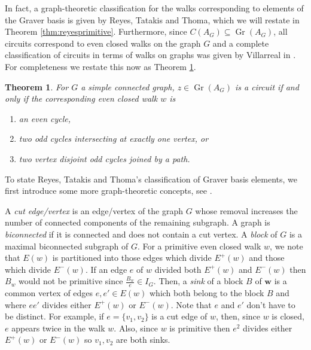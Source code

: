 \documentclass[a4paper, 12pt]{article}
\theoremstyle{plain}
\newtheorem{theorem}{Theorem}[section]
\theoremstyle{definition}
\theoremstyle{remark}
\begin{document}
In fact, a graph-theoretic classification for the walks corresponding to elements of the Graver basis is given by Reyes, Tatakis and Thoma, which we will restate in Theorem \ref{thm:reyesprimitive}. Furthermore, since $C(A_G) \subseteq \operatorname{Gr}(A_G)$, all circuits correspond to even closed walks on the graph $G$ and a complete classification of circuits in terms of walks on graphs was given by Villarreal in \cite[Proposition 4.2]{Vil_1995}. For completeness we restate this now as Theorem \ref{thm:villarealcircuits}.

\begin{theorem} \cite[Proposition 4.2]{Vil_1995} \label{thm:villarealcircuits}
    For $G$ a simple connected graph, $z \in \operatorname{Gr}(A_G)$ is a circuit if and only if the corresponding even closed walk $w$ is
    \begin{enumerate}
        \item\label{item:circ1} an even cycle,
        \item\label{item:circ2} two odd cycles intersecting at exactly one vertex, or
        \item\label{item:circ3} two vertex disjoint odd cycles joined by a path.
    \end{enumerate}
\end{theorem}

To state Reyes, Tatakis and Thoma's classification of Graver basis elements, we first introduce some more graph-theoretic concepts, see \cite[Section 3]{Reyes2012minimal}.

A \textit{cut edge/vertex} is an edge/vertex of the graph $G$ whose removal increases the number of connected components of the remaining subgraph. A graph is \textit{biconnected} if it is connected and does not contain a cut vertex. A \textit{block} of $G$ is a maximal biconnected subgraph of $G$. For a primitive even closed walk $w$, we note that $E(w)$ is partitioned into those edges which divide $E^+(w)$ and those which divide $E^-(w)$. If an edge $e$ of $w$ divided both $E^+(w)$ and $E^-(w)$ then $B_w$ would not be primitive since $\frac{B_w}{e} \in I_G$. Then, a \textit{sink} of a block $B$ of $\mathbf{w}$ is a common vertex of edges $e,e' \in E(w)$ which both belong to the block $B$ and where $ee'$ divides either $E^+(w)$ or $E^-(w)$. Note that $e$ and $e'$ don't have to be distinct. For example, if $e=\{v_1,v_2\}$ is a cut edge of $w$, then, since $w$ is closed, $e$ appears twice in the walk $w$. Also, since $w$ is primitive then $e^2$ divides either $E^+(w)$ or $E^-(w)$ so $v_1,v_2$ are both sinks.
\end{document}

